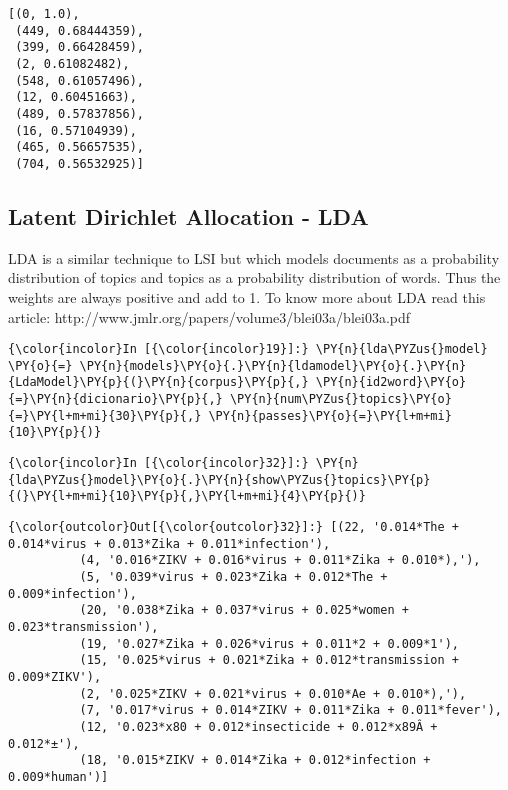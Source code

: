     \begin{Verbatim}[commandchars=\\\{\}]
[(0, 1.0),
 (449, 0.68444359),
 (399, 0.66428459),
 (2, 0.61082482),
 (548, 0.61057496),
 (12, 0.60451663),
 (489, 0.57837856),
 (16, 0.57104939),
 (465, 0.56657535),
 (704, 0.56532925)]

    \end{Verbatim}

    \subsection{Latent Dirichlet Allocation -
LDA}\label{latent-dirichlet-allocation---lda}

LDA is a similar technique to LSI but which models documents as a
probability distribution of topics and topics as a probability
distribution of words. Thus the weights are always positive and add to
1. To know more about LDA read this article:
http://www.jmlr.org/papers/volume3/blei03a/blei03a.pdf

    \begin{Verbatim}[commandchars=\\\{\}]
{\color{incolor}In [{\color{incolor}19}]:} \PY{n}{lda\PYZus{}model} \PY{o}{=} \PY{n}{models}\PY{o}{.}\PY{n}{ldamodel}\PY{o}{.}\PY{n}{LdaModel}\PY{p}{(}\PY{n}{corpus}\PY{p}{,} \PY{n}{id2word}\PY{o}{=}\PY{n}{dicionario}\PY{p}{,} \PY{n}{num\PYZus{}topics}\PY{o}{=}\PY{l+m+mi}{30}\PY{p}{,} \PY{n}{passes}\PY{o}{=}\PY{l+m+mi}{10}\PY{p}{)}
\end{Verbatim}

    \begin{Verbatim}[commandchars=\\\{\}]
{\color{incolor}In [{\color{incolor}32}]:} \PY{n}{lda\PYZus{}model}\PY{o}{.}\PY{n}{show\PYZus{}topics}\PY{p}{(}\PY{l+m+mi}{10}\PY{p}{,}\PY{l+m+mi}{4}\PY{p}{)}
\end{Verbatim}

            \begin{Verbatim}[commandchars=\\\{\}]
{\color{outcolor}Out[{\color{outcolor}32}]:} [(22, '0.014*The + 0.014*virus + 0.013*Zika + 0.011*infection'),
          (4, '0.016*ZIKV + 0.016*virus + 0.011*Zika + 0.010*),'),
          (5, '0.039*virus + 0.023*Zika + 0.012*The + 0.009*infection'),
          (20, '0.038*Zika + 0.037*virus + 0.025*women + 0.023*transmission'),
          (19, '0.027*Zika + 0.026*virus + 0.011*2 + 0.009*1'),
          (15, '0.025*virus + 0.021*Zika + 0.012*transmission + 0.009*ZIKV'),
          (2, '0.025*ZIKV + 0.021*virus + 0.010*Ae + 0.010*),'),
          (7, '0.017*virus + 0.014*ZIKV + 0.011*Zika + 0.011*fever'),
          (12, '0.023*x80 + 0.012*insecticide + 0.012*x89Â + 0.012*±'),
          (18, '0.015*ZIKV + 0.014*Zika + 0.012*infection + 0.009*human')]
\end{Verbatim}
        
